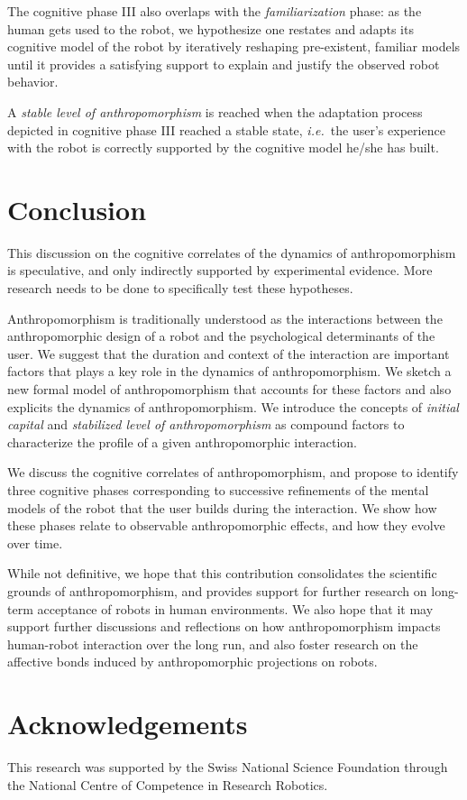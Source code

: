 \documentclass{sig-alternate-2013}
\newcommand{\ie}{{\textit{i.e.~}}}
\begin{document}
The cognitive phase III also overlaps with the \emph{familiarization} phase: as
the human gets used to the robot, we hypothesize one restates and adapts its
cognitive model of the robot by iteratively reshaping pre-existent, familiar
models until it provides a satisfying support to explain and justify the
observed robot behavior.

A \emph{stable level of anthropomorphism} is reached when the adaptation process
depicted in cognitive phase III reached a stable state, \ie the user's experience
with the robot is correctly supported by the cognitive model he/she has
built.

\section{Conclusion}
\label{sec:conclusion}

This discussion on the cognitive correlates of the dynamics of anthropomorphism
is speculative, and only indirectly supported by experimental evidence. More
research needs to be done to specifically test these hypotheses.

Anthropomorphism is traditionally understood as the interactions between the
anthropomorphic design of a robot and the psychological determinants of the
user. We suggest that the duration and context of the interaction are important
factors that plays a key role in the dynamics of anthropomorphism. We sketch a
new formal model of anthropomorphism that accounts for these factors and also
explicits the dynamics of anthropomorphism.  We introduce the concepts of
\emph{initial capital} and \emph{stabilized level of anthropomorphism} as
compound factors to characterize the profile of a given anthropomorphic
interaction.

We discuss the cognitive correlates of anthropomorphism, and propose to identify
three cognitive phases corresponding to successive refinements of the mental
models of the robot that the user builds during the interaction. We show how
these phases relate to observable anthropomorphic effects, and how they evolve
over time.

While not definitive, we hope that this contribution consolidates the scientific
grounds of anthropomorphism, and provides support for further research on
long-term acceptance of robots in human environments. We also hope that it may
support further discussions and reflections on how anthropomorphism impacts
human-robot interaction over the long run, and also foster research on the
affective bonds induced by anthropomorphic projections on robots.

\section*{Acknowledgements}
This research was supported by the Swiss National Science Foundation through
the National Centre of Competence in Research Robotics.


 
\end{document}

